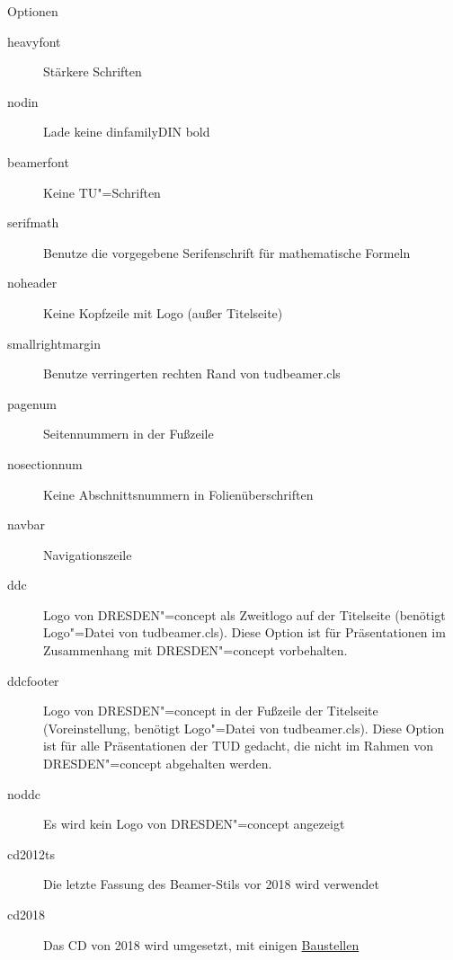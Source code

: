 \begin{frame}[allowframebreaks]{Optionen}
  \begin{description}
    \item[heavyfont] Stärkere Schriften
    \item[nodin] Lade keine {\csname dinfamily\endcsname DIN bold}%
    \item[beamerfont] Keine TU"=Schriften
    \item[serifmath] Benutze die vorgegebene Serifenschrift für mathematische Formeln
    \item[noheader] Keine Kopfzeile mit Logo (außer Titelseite)
    \item[smallrightmargin] Benutze verringerten rechten Rand von tudbeamer.cls
    \item[pagenum] Seitennummern in der Fußzeile
    \item[nosectionnum] Keine Abschnittsnummern in Folienüberschriften
    \item[navbar] Navigationszeile
    \item[ddc] Logo von DRESDEN"=concept als Zweitlogo auf der
      Titelseite (benötigt Logo"=Datei von tudbeamer.cls). Diese
      Option ist für Präsentationen im Zusammenhang mit DRESDEN"=concept
      vorbehalten.
    \item[ddcfooter] Logo von DRESDEN"=concept in der Fußzeile der
      Titelseite (Voreinstellung, benötigt Logo"=Datei von
      tudbeamer.cls). Diese Option ist für alle Präsentationen der TUD
      gedacht, die nicht im Rahmen von DRESDEN"=concept abgehalten
      werden.
    \item[noddc] Es wird kein Logo von DRESDEN"=concept angezeigt
    \item[cd2012ts] Die letzte Fassung des Beamer-Stils vor 2018 wird verwendet
    \item[cd2018] Das CD von 2018 wird umgesetzt, mit einigen \hyperref[baustellen]{Baustellen}
  \end{description}
\end{frame}


